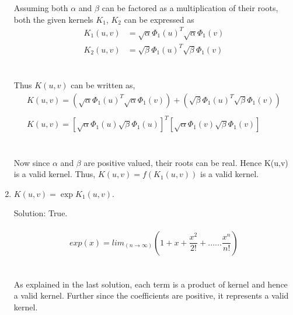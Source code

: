 \documentclass[twoside,11pt]{article}\usepackage{amsmath,amsfonts,amsthm,fullpage}
\begin{document}
\begin{enumerate}
\\\\Assuming both $\alpha$ and $\beta$ can be factored as a multiplication of their roots, both the given kernels $K_1$, $K_2$ can be expressed as
\begin{equation} \nonumber
\begin{split}
K_1(u,v) &= {\sqrt{\alpha}\Phi_1(u)}^T{\sqrt{\alpha}\Phi_1(v)} \\
K_2(u,v) &= {\sqrt{\beta}\Phi_1(u)}^T{\sqrt{\beta}\Phi_1(v)}
\end{split}
\end{equation}
\\\\ Thus $K(u,v) $ can be written as,
\begin{equation} \nonumber
\begin{split}
K(u,v) = ({\sqrt{\alpha}\Phi_1(u)}^T{\sqrt{\alpha}\Phi_1(v)}) +  ({\sqrt{\beta}\Phi_1(u)}^T{\sqrt{\beta}\Phi_1(v)})   \\\\
K(u,v) = {[\sqrt{\alpha}\Phi_1(u) \sqrt{\beta}\Phi_1(u)]}^T [\sqrt{\alpha}\Phi_1(v)   \sqrt{\beta}\Phi_1(v)]
\end{split}
\end{equation}
\\\\ Now since $\alpha$ and $\beta$ are positive valued, their roots can be real. Hence K(u,v) is  a valid kernel. 
Thus,  $K(u,v) = f(K_1(u,v))$ is a valid kernel.\\
\item $K(u,v) = \exp{K_1(u,v)}$.

Solution: True. 
\\\\ \begin{equation} \nonumber
exp(x)  = lim_{(n \rightarrow \infty)} (1 + x + \frac{x^2}{2!} + ...... \frac{x^n}{n!})
\end{equation}
\\\\ As explained in the last solution, each term is a product of kernel and hence a valid kernel. Further since the coefficients are positive, it represents a valid kernel.\\\\


\end{enumerate}
\end{document}
